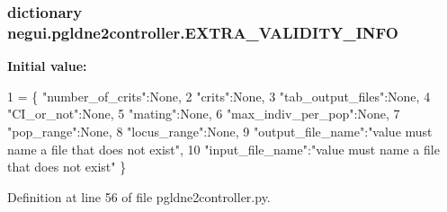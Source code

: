 \subsubsection[{\texorpdfstring{E\+X\+T\+R\+A\+\_\+\+V\+A\+L\+I\+D\+I\+T\+Y\+\_\+\+I\+N\+FO}{EXTRA_VALIDITY_INFO}}]{\setlength{\rightskip}{0pt plus 5cm}dictionary negui.\+pgldne2controller.\+E\+X\+T\+R\+A\+\_\+\+V\+A\+L\+I\+D\+I\+T\+Y\+\_\+\+I\+N\+FO}\hypertarget{namespacenegui_1_1pgldne2controller_ab13d08c13014e3b1fe211955f8e70422}{}\label{namespacenegui_1_1pgldne2controller_ab13d08c13014e3b1fe211955f8e70422}
{\bfseries Initial value\+:}
\begin{DoxyCode}
1 = \{ \textcolor{stringliteral}{"number\_of\_crits"}:\textcolor{keywordtype}{None},
2                                     \textcolor{stringliteral}{"crits"}:\textcolor{keywordtype}{None},
3                                     \textcolor{stringliteral}{"tab\_output\_files"}:\textcolor{keywordtype}{None},
4                                     \textcolor{stringliteral}{"CI\_or\_not"}:\textcolor{keywordtype}{None},
5                                     \textcolor{stringliteral}{"mating"}:\textcolor{keywordtype}{None},
6                                     \textcolor{stringliteral}{"max\_indiv\_per\_pop"}:\textcolor{keywordtype}{None},
7                                     \textcolor{stringliteral}{"pop\_range"}:\textcolor{keywordtype}{None},
8                                     \textcolor{stringliteral}{"locus\_range"}:\textcolor{keywordtype}{None},
9                                     \textcolor{stringliteral}{"output\_file\_name"}:\textcolor{stringliteral}{"value must name a file that does not exist"},
10                                     \textcolor{stringliteral}{"input\_file\_name"}:\textcolor{stringliteral}{"value must name a file that does not exist"} \}
\end{DoxyCode}


Definition at line 56 of file pgldne2controller.\+py.

